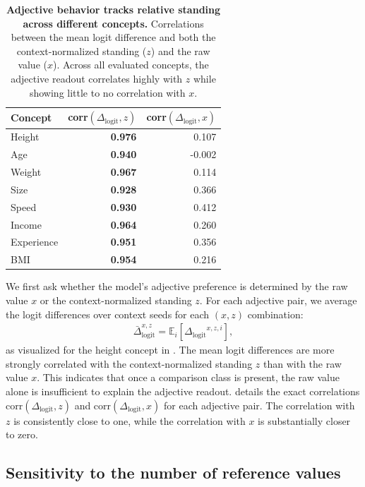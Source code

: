 \documentclass{article}
\newcommand{\logitdiff}{\ensuremath{\Delta_{\mathrm{logit}}}}
\begin{document}
\begin{table}[t]
  \centering
  \footnotesize
  \setlength{\tabcolsep}{4pt}
  \caption{\textbf{Adjective behavior tracks relative standing across different concepts.}
  Correlations between the mean logit difference and both the context-normalized standing ($z$) and the raw value ($x$). Across all evaluated concepts, the adjective readout correlates highly with $z$ while showing little to no correlation with $x$.
  }
  \label{tab:behavioral-z-corr}
  \begin{tabular}{lrr}
    \toprule
    Concept & corr$(\logitdiff,z)$ & corr$(\logitdiff,x)$ \\
    \midrule
    Height & \textbf{0.976} & 0.107 \\
    Age & \textbf{0.940} & -0.002 \\
    Weight & \textbf{0.967} & 0.114 \\
    Size & \textbf{0.928} & 0.366 \\
    Speed & \textbf{0.930} & 0.412 \\
    Income & \textbf{0.964} & 0.260 \\
    Experience & \textbf{0.951} & 0.356 \\
    BMI & \textbf{0.954} & 0.216 \\
    \bottomrule
  \end{tabular}
\end{table}

We first ask whether the model's adjective preference is determined by the raw value $x$ or the context-normalized standing $z$.
For each adjective pair, we average the logit differences over context seeds for each $(x, z)$ combination:
\begin{align*}
    \bar{\Delta}_{\mathrm{logit}}^{x,z}=\mathbb{E}_{i}[\logitdiff^{x,z,i}],
\end{align*}
as visualized for the height concept in .
The mean logit differences are more strongly correlated with the context-normalized standing $z$ than with the raw value $x$.
This indicates that once a comparison class is present, the raw value alone is insufficient to explain the adjective readout.
 details the exact correlations corr$(\logitdiff,z)$ and corr$(\logitdiff,x)$ for each adjective pair. The correlation with $z$ is consistently close to one, while the correlation with $x$ is substantially closer to zero.





\subsection{Sensitivity to the number of reference values}
\label{subsec:sensitivity-number}
\end{document}

